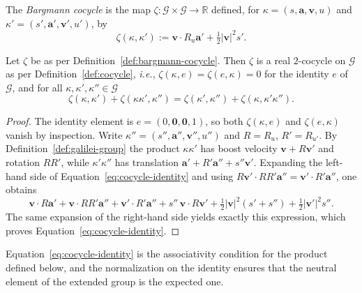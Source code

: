 \begin{definition}\label{def:bargmann-cocycle}
	The \emph{Bargmann cocycle} is the map $\zeta:\mathcal{G}\times\mathcal{G}\to\mathbb{R}$ defined, for $\kappa=(s,\mathbf{a},\mathbf{v},u)$ and $\kappa'=(s',\mathbf{a}',\mathbf{v}',u')$, by
	\begin{equation}
		\zeta(\kappa,\kappa') := \mathbf{v}\cdot R_u\mathbf{a}' + \tfrac{1}{2}|\mathbf{v}|^2 s'.
	\end{equation}
\end{definition}

\begin{lemma}\label{lem:cocycle}
	Let $\zeta$ be as per Definition~\ref{def:bargmann-cocycle}. Then $\zeta$ is a real $2$-cocycle on $\mathcal{G}$ as per Definition~\ref{def:cocycle}, \textit{i.e.}, $\zeta(\kappa,e)=\zeta(e,\kappa)=0$ for the identity $e$ of $\mathcal{G}$, and for all $\kappa,\kappa',\kappa''\in\mathcal{G}$
	\begin{equation}
		\zeta(\kappa,\kappa')+\zeta(\kappa\kappa',\kappa'') = \zeta(\kappa',\kappa'')+\zeta(\kappa,\kappa'\kappa'').
		\label{eq:cocycle-identity}
	\end{equation}
\end{lemma}

\begin{proof}
	The identity element is $e=(0,\mathbf{0},\mathbf{0},1)$, so both $\zeta(\kappa,e)$ and $\zeta(e,\kappa)$ vanish by inspection. Write $\kappa''=(s'',\mathbf{a}'',\mathbf{v}'',u'')$ and $R=R_u$, $R'=R_{u'}$. By Definition~\ref{def:galilei-group} the product $\kappa\kappa'$ has boost velocity $\mathbf{v}+R\mathbf{v}'$ and rotation $RR'$, while $\kappa'\kappa''$ has translation $\mathbf{a}'+R'\mathbf{a}''+s''\mathbf{v}'$. Expanding the left-hand side of Equation~\eqref{eq:cocycle-identity} and using $R\mathbf{v}'\cdot RR'\mathbf{a}''=\mathbf{v}'\cdot R'\mathbf{a}''$, one obtains
	\begin{equation*}
		\mathbf{v}\cdot R\mathbf{a}'+\mathbf{v}\cdot RR'\mathbf{a}''+\mathbf{v}'\cdot R'\mathbf{a}''+s''\,\mathbf{v}\cdot R\mathbf{v}'+\tfrac{1}{2}|\mathbf{v}|^2(s'+s'')+\tfrac{1}{2}|\mathbf{v}'|^2s''.
	\end{equation*}
	The same expansion of the right-hand side yields exactly this expression, which proves Equation~\eqref{eq:cocycle-identity}.
\end{proof}

\noindent Equation~\eqref{eq:cocycle-identity} is the associativity condition for the product defined below, and the normalization on the identity ensures that the neutral element of the extended group is the expected one.

